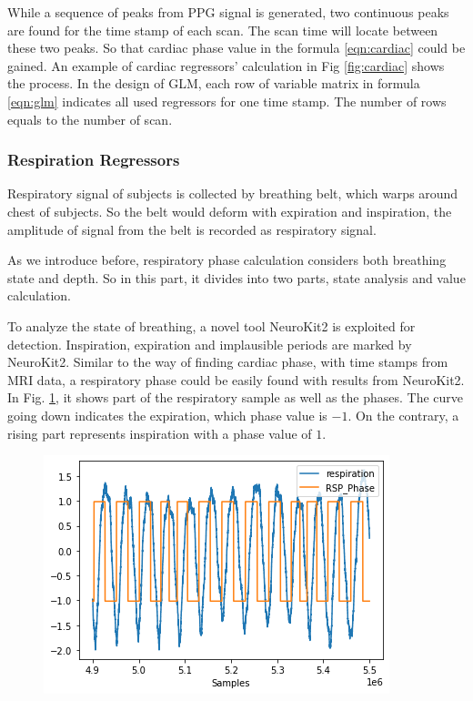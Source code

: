 While a sequence of peaks from PPG signal is generated, 
two continuous peaks are found for the time stamp of each scan.
The scan time will locate between these two peaks. 
So that cardiac phase value in the formula \ref{eqn:cardiac} could be gained. An example of 
cardiac regressors' calculation in Fig \ref{fig:cardiac} shows the process. 
In the design of GLM, each row of variable matrix in formula \ref{eqn:glm} indicates all used regressors
for one time stamp. The number of rows equals to the number of scan.

\subsubsection{Respiration Regressors}

Respiratory signal of subjects is collected by breathing belt, which warps around chest of subjects. 
So the belt would deform with expiration and inspiration, the amplitude of signal from the 
belt is recorded as respiratory signal. 

As we introduce before, respiratory phase calculation considers both breathing state and depth.
So in this part, it divides into two parts, state analysis and value calculation.

To analyze the state of breathing, a novel tool NeuroKit2\cite{Makowski2021neurokit} is exploited 
for detection. Inspiration, expiration and implausible periods are marked by NeuroKit2. 
Similar to the way of finding cardiac phase, with time stamps from MRI data, a respiratory phase
could be easily found with results from NeuroKit2. In Fig. \ref{fig:rsp_phase}, it shows part of the 
respiratory sample as well as the phases. The curve going down indicates the expiration, which 
phase value is $-1$. On the contrary, a rising part represents inspiration with a phase value of $1$. 

\begin{figure}[htp]
    \centering
    \includegraphics[width=\columnwidth]{Figures/rsp_phase.png}
    \caption{}
    \label{fig:rsp_phase}
\end{figure} 

